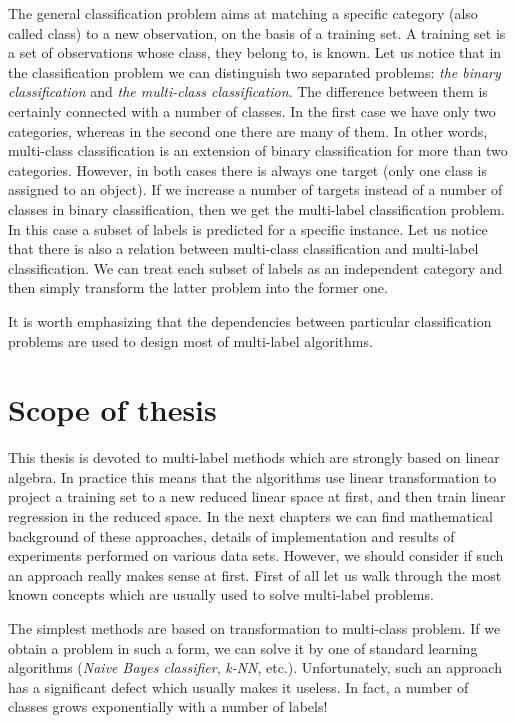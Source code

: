 The general classification problem aims at matching a specific category (also called class) to a new observation, on the basis of a training set. A training set is a set of observations whose class, they belong to, is known. Let us notice that in the classification problem we can distinguish two separated problems: \textit{the binary classification} and \textit{the multi-class classification}. The difference between them is certainly connected with a number of classes. In the first case we have only two categories, whereas in the second one there are many of them. In other words, multi-class classification is an extension of binary classification for more than two categories. However, in both cases there is always one target (only one class is assigned to an object). If we increase a number of targets instead of a number of classes in binary classification, then we get the multi-label classification problem. In this case a subset of labels is predicted for a specific instance. Let us notice that there is also a relation between multi-class classification and multi-label classification. We can treat each subset of labels as an independent category and then simply transform the latter problem into the former one. 

It is worth emphasizing that the dependencies between particular classification problems are used to design most of multi-label algorithms. 

\section{Scope of thesis}

This thesis is devoted to multi-label methods which are strongly based on linear algebra. In practice this means that the algorithms use linear transformation to project a training set to a new reduced linear space at first, and then train linear regression in the reduced space. In the next chapters we can find mathematical background of these approaches, details of implementation and results of experiments performed on various data sets. However, we should consider if such an approach really makes sense at first. First of all let us walk through the most known concepts which are usually used to solve multi-label problems.

The simplest methods are based on transformation to multi-class problem. If we obtain a problem in such a form, we can solve it by one of standard learning algorithms (\textit{Naive Bayes classifier}, \textit{k-NN}, etc.). Unfortunately, such an approach has a significant defect which usually makes it useless. In fact, a number of classes grows exponentially with a number of labels!

